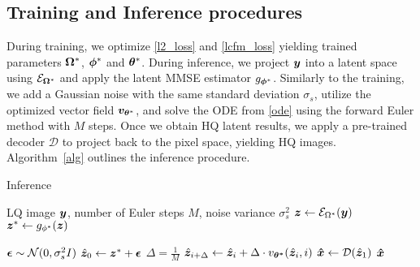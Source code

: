\subsection{Training and Inference procedures}\label{infer}
During training, we optimize \eqref{l2_loss} and \eqref{lcfm_loss} yielding trained parameters $\bm{\Omega}^{*}$, $\bm{\phi}^{*}$ and $\bm{\theta}^{*}$.
During inference, we project $\bm{y}$ into a latent space using $\mathcal{E}_{\bm{\Omega}^{*}}$ and apply the latent MMSE estimator $g_{\bm{\phi}^{*}}$. Similarly to the training, we add a Gaussian noise with the same standard deviation $\sigma_{s}$, utilize the optimized vector field $\bm{v}_{\bm{\theta}^{*}}$, and solve the ODE from \eqref{ode} using the forward Euler method with $M$ steps. Once we obtain HQ latent results, we apply a pre-trained decoder $\mathcal{D}$ to project back to the pixel space, yielding HQ images. Algorithm~\ref{alg} outlines the inference procedure.


\begin{algorithm}[t]
\caption{\name Inference}
\label{alg}
\begin{algorithmic}
\REQUIRE LQ image $\bm{y}$, number of Euler steps $M$, noise variance $\sigma_{s}^2$ 
\vspace{-2ex}
\STATE $\bm{z}\gets \mathcal{E}_{\Omega^{*}}(\bm{y})$   %
\STATE $\bm{z}^* \gets g_{\phi^{*}}(\bm{z}) $ 

\STATE $\bm{\epsilon}\sim\mathcal{N}(0,\sigma^2_{s}I)$
\STATE $\hat{\bm{z}}_0\gets \bm{z}^*+ \bm{\epsilon}$
\vspace{-2ex}
\STATE $\Delta=\frac{1}{M} $
    \STATE$\hat{\bm{z}}_{i+\Delta} \gets \hat{\bm{z}}_{i} + \Delta \cdot v_{\bm{\theta^{*}}}(\hat{\bm{z}}_{i},i)$
\ENDFOR
\STATE $\bm{\hat{x}} \gets \mathcal{D}(\hat{\bm{z}}_1)$ 
\RETURN $\bm{\hat{x}}$
\end{algorithmic}
\end{algorithm}




